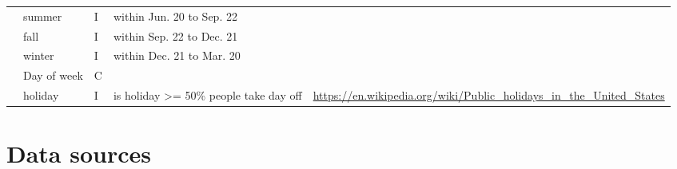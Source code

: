 \documentclass[12pt]{article}
\begin{document}
{\begin{longtable}{lllp{4cm}p{4cm}}
              & summer                     & I    & within Jun. 20 to Sep. 22                                                                                                                &                                                                         \\
              & fall                       & I    & within Sep. 22 to Dec. 21                                                                                                                &                                                                         \\
              & winter                     & I    & within Dec. 21 to Mar. 20                                                                                                                &                                                                         \\
              & Day of week & C    & &\\
              & holiday                    & I    & is holiday \textgreater= 50\% people take day off                                                                                        & \url{https://en.wikipedia.org/wiki/Public\_holidays\_in\_the\_United\_States}\\
              \hline
\end{longtable}}
\FloatBarrier
\section{Data sources}
\end{document}
